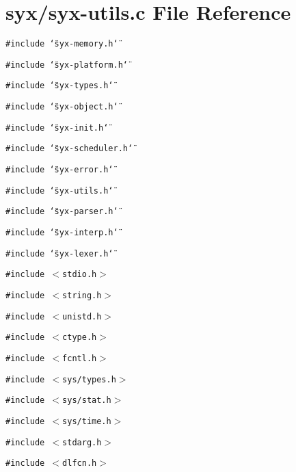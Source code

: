 \hypertarget{syx-utils_8c}{
\section{syx/syx-utils.c File Reference}
\label{syx-utils_8c}
}
{\tt \#include \char`\"{}syx-memory.h\char`\"{}}\par
{\tt \#include \char`\"{}syx-platform.h\char`\"{}}\par
{\tt \#include \char`\"{}syx-types.h\char`\"{}}\par
{\tt \#include \char`\"{}syx-object.h\char`\"{}}\par
{\tt \#include \char`\"{}syx-init.h\char`\"{}}\par
{\tt \#include \char`\"{}syx-scheduler.h\char`\"{}}\par
{\tt \#include \char`\"{}syx-error.h\char`\"{}}\par
{\tt \#include \char`\"{}syx-utils.h\char`\"{}}\par
{\tt \#include \char`\"{}syx-parser.h\char`\"{}}\par
{\tt \#include \char`\"{}syx-interp.h\char`\"{}}\par
{\tt \#include \char`\"{}syx-lexer.h\char`\"{}}\par
{\tt \#include $<$stdio.h$>$}\par
{\tt \#include $<$string.h$>$}\par
{\tt \#include $<$unistd.h$>$}\par
{\tt \#include $<$ctype.h$>$}\par
{\tt \#include $<$fcntl.h$>$}\par
{\tt \#include $<$sys/types.h$>$}\par
{\tt \#include $<$sys/stat.h$>$}\par
{\tt \#include $<$sys/time.h$>$}\par
{\tt \#include $<$stdarg.h$>$}\par
{\tt \#include $<$dlfcn.h$>$}\par
